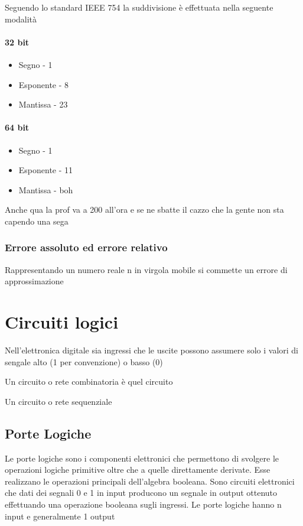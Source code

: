 \documentclass[12pt, a4paper, openany]{book}
\begin{document}
Seguendo lo standard IEEE 754 la suddivisione è effettuata nella seguente modalità
\subsubsection{32 bit}
\begin{itemize}
    \item Segno - 1
    \item Esponente - 8
    \item Mantissa - 23
\end{itemize}
\subsubsection{64 bit}
\begin{itemize}
    \item Segno - 1
    \item Esponente - 11
    \item Mantissa - boh
\end{itemize}
Anche qua la prof va a 200 all'ora e se ne sbatte il cazzo che la gente non sta capendo una sega

\subsection{Errore assoluto ed errore relativo}
Rappresentando un numero reale n in virgola mobile si commette un errore di approssimazione

\chapter{Circuiti logici}

Nell'elettronica digitale sia ingressi che le uscite possono assumere solo i valori di sengale alto (1 per convenzione) o basso (0)

Un circuito o rete combinatoria è quel circuito

Un circuito o rete sequenziale

\section{Porte Logiche}
Le porte logiche sono i componenti elettronici che permettono di svolgere le operazioni logiche
primitive oltre che a quelle direttamente derivate.
Esse realizzano le operazioni principali dell'algebra booleana. Sono circuiti elettronici che dati dei segnali 0 e 1 in input
producono un segnale in output ottenuto effettuando una operazione booleana sugli ingressi.
Le porte logiche hanno n input e generalmente 1 output
\end{document}
